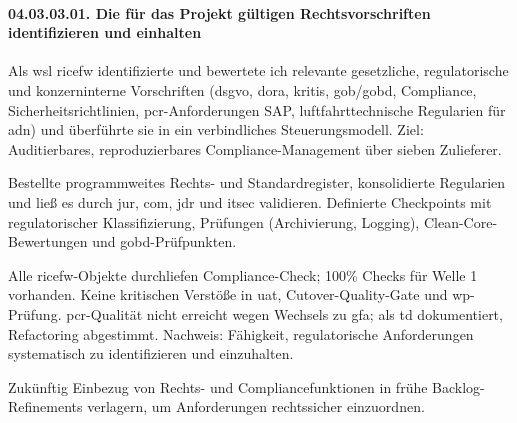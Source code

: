 \paragraph*{04.03.03.01. Die für das Projekt gültigen Rechtsvorschriften identifizieren und einhalten}
\label{para:04.03.03.01_Rechtsvorschriften}
\par Als \gls{wsl} \gls{ricefw} identifizierte und bewertete ich relevante gesetzliche, regulatorische und konzerninterne Vorschriften (\gls{dsgvo}, \gls{dora}, \gls{kritis}, \gls{gob}/\gls{gobd}, Compliance, Sicherheitsrichtlinien, \gls{pcr}-Anforderungen SAP, luftfahrttechnische Regularien für \gls{adn}) und überführte sie in ein verbindliches Steuerungsmodell. Ziel: Auditierbares, reproduzierbares Compliance-Management über sieben Zulieferer.

\par Bestellte programmweites Rechts- und Standardregister, konsolidierte Regularien und ließ es durch \gls{jur}, \gls{com}, \gls{jdr} und \gls{itsec} validieren. Definierte Checkpoints mit regulatorischer Klassifizierung, Prüfungen (Archivierung, Logging), Clean-Core-Bewertungen und \gls{gobd}-Prüfpunkten.

\par Alle \gls{ricefw}-Objekte durchliefen Compliance-Check; 100\% Checks für Welle 1 vorhanden. Keine kritischen Verstöße in \gls{uat}, Cutover-Quality-Gate und \gls{wp}-Prüfung. \gls{pcr}-Qualität nicht erreicht wegen Wechsels zu \gls{gfa}; als \gls{td} dokumentiert, Refactoring abgestimmt. Nachweis: Fähigkeit, regulatorische Anforderungen systematisch zu identifizieren und einzuhalten.

\par Zukünftig Einbezug von Rechts- und Compliancefunktionen in frühe Backlog-Refinements verlagern, um Anforderungen rechtssicher einzuordnen. 
